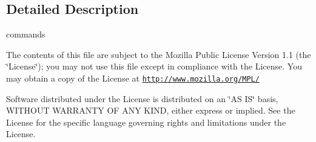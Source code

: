\subsection{Detailed Description}
commands

The contents of this file are subject to the Mozilla Public License Version 1.1 (the \char`\"{}License\char`\"{}); you may not use this file except in compliance with the License. You may obtain a copy of the License at \href{http://www.mozilla.org/MPL/}{\tt http://www.mozilla.org/MPL/}

Software distributed under the License is distributed on an \char`\"{}AS IS\char`\"{} basis, WITHOUT WARRANTY OF ANY KIND, either express or implied. See the License for the specific language governing rights and limitations under the License. 